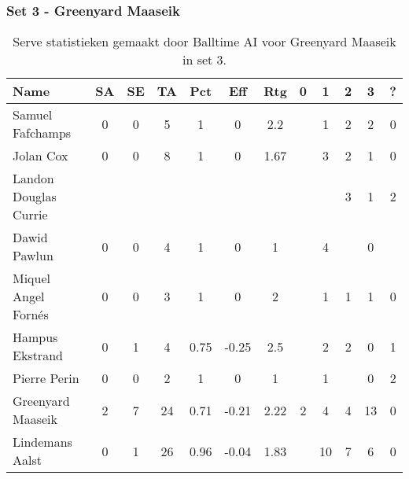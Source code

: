 \subsubsection{Set 3 - Greenyard Maaseik}
\label{sec:PL3_Greenyard3}
\begin{table}[ht!]
  \centering
  \scriptsize
  \begin{tabular}{|l|c|c|c|c|c|c|c|c|c|c|c|} \hline
    \textbf{Name} & SA & SE & TA & Pct & Eff & Rtg & 0 & 1 & 2 & 3 & ? \\ \hline
    Samuel Fafchamps & 0 & 0 & 5 & 1 & 0 & 2.2 &   & 1 & 2 & 2 & 0 \\
    Jolan Cox & 0 & 0 & 8 & 1 & 0 & 1.67 &   & 3 & 2 & 1 & 0 \\
    Landon Douglas Currie &   &   &   &   &   &   &   &   & 3 & 1 & 2 \\
    Dawid Pawlun & 0 & 0 & 4 & 1 & 0 & 1 &   & 4 &   & 0 &   \\
    Miquel Angel Fornés & 0 & 0 & 3 & 1 & 0 & 2 &   & 1 & 1 & 1 & 0 \\
    Hampus Ekstrand & 0 & 1 & 4 & 0.75 & -0.25 & 2.5 &   & 2 & 2 & 0 & 1 \\
    Pierre Perin & 0 & 0 & 2 & 1 & 0 & 1 &   & 1 &   & 0 & 2 \\
    Greenyard Maaseik & 2 & 7 & 24 & 0.71 & -0.21 & 2.22 & 2 & 4 & 4 & 13 & 0 \\
    Lindemans Aalst & 0 & 1 & 26 & 0.96 & -0.04 & 1.83 &   & 10 & 7 & 6 & 0 \\ \hline
  \end{tabular}
  \caption[Serve statistieken gemaakt door Balltime AI voor Greenyard Maaseik in set 3]{\label{tab:PL3ServeGreenyard3}Serve statistieken gemaakt door Balltime AI voor Greenyard Maaseik in set 3.}
\end{table}

